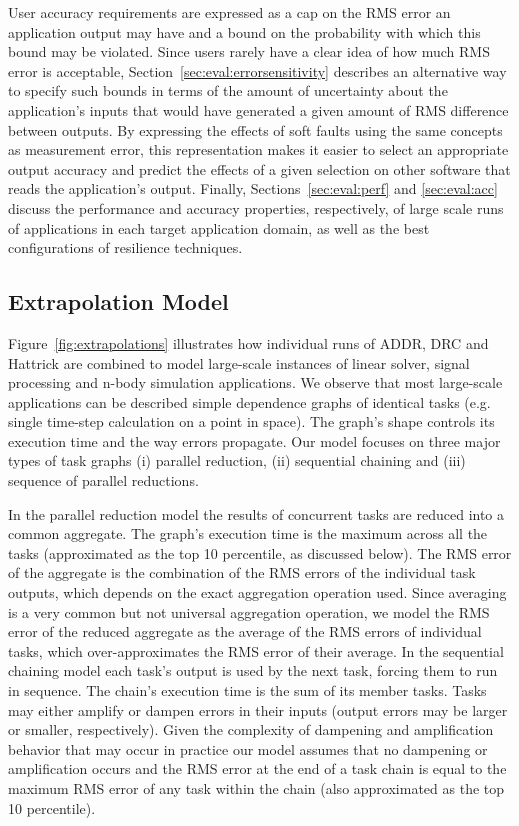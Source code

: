 \documentclass[10pt, conference, compsocconf]{IEEEtran}
\begin{document}
User accuracy requirements are expressed as a cap on the RMS error an application output may have and a bound on the probability with which this bound may be violated.
Since users rarely have a clear idea of how much RMS error is acceptable, Section~\ref{sec:eval:errorsensitivity} describes an alternative way to specify such bounds in terms of the amount of uncertainty about the application's inputs that would have generated a given amount of RMS difference between outputs.
By expressing the effects of soft faults using the same concepts as measurement error, this representation makes it easier to select an appropriate output accuracy and predict the effects of a given selection on other software that reads the application's output.
Finally, Sections~\ref{sec:eval:perf} and \ref{sec:eval:acc} discuss the performance and accuracy properties, respectively, of large scale runs of applications in each target application domain, as well as the best configurations of resilience techniques.

\vspace{-10pt}
\subsection{Extrapolation Model}
\vspace{-10pt}
\label{sec:eval:extrapolation}

Figure~\ref{fig:extrapolations} illustrates how individual runs of ADDR, DRC and Hattrick are combined to model large-scale instances of linear solver, signal processing and n-body simulation applications.
We observe that most large-scale applications can be described simple dependence graphs of identical tasks (e.g. single time-step calculation on a point in space).
The graph's shape controls its execution time and the way errors propagate.
Our model focuses on three major types of task graphs (i) parallel reduction, (ii) sequential chaining and (iii) sequence of parallel reductions.

In the parallel reduction model the results of concurrent tasks are reduced into a common aggregate.
The graph's execution time is the maximum across all the tasks (approximated as the top 10 percentile, as discussed below).
The RMS error of the aggregate is the combination of the RMS errors of the individual task outputs, which depends on the exact aggregation operation used.
Since averaging is a very common but not universal aggregation operation, we model the RMS error of the reduced aggregate as the average of the RMS errors of individual tasks, which over-approximates the RMS error of their average.
In the sequential chaining model each task's output is used by the next task, forcing them to run in sequence.
The chain's execution time is the sum of its member tasks.
Tasks may either amplify or dampen errors in their inputs (output errors may be larger or smaller, respectively).
Given the complexity of dampening and amplification behavior that may occur in practice our model assumes that no dampening or amplification occurs and the RMS error at the end of a task chain is equal to the maximum RMS error of any task within the chain (also approximated as the top 10 percentile).
\end{document}
